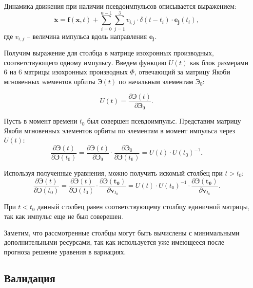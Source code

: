 Динамика движения при наличии псевдоимпульсов описывается выражением:
\begin{equation*}
    \ddot{\mathbf{x}} = \mathbf{f}(\mathbf{x}, t) +
        \sum_{i=0}^{n-1} \sum_{j=1}^{3} v_{i,j} 
                    \cdot \delta (t - t_i) \cdot \mathbf{e_j} (t_i),
\end{equation*}
где $v_{i,j}$ -- величина импульса вдоль направления $\mathbf{e_j}$.

Получим выражение для столбца в матрице изохронных производных, соответствующего одному импульсу.
Введем функцию $U(t)$ как блок размерами 6 на 6 матрицы изохронных производных $\Phi$, отвечающий за
матрицу Якоби мгновенных элементов орбиты $\mathbf{\textbf{Э}}(t)$ по начальным элементам 
$\mathbf{\textbf{Э}}_0$:

\begin{equation*}
    U(t) = \frac{\partial \mathbf{\textbf{Э}}(t)}{\partial \mathbf{\textbf{Э}}_0}.
\end{equation*}

Пусть в момент времени $t_0$ был совершен псевдоимпульс.
Представим матрицу Якоби мгновенных элементов орбиты по элементам в момент импульса через $U(t)$:
\begin{equation*}
    \frac{\partial \mathbf{\textbf{Э}}(t)}{\partial \mathbf{\textbf{Э}}(t_0)} = 
    \frac{\partial \mathbf{\textbf{Э}}(t)}{\partial \mathbf{\textbf{Э}}_0} \cdot
    \frac{\partial \mathbf{\textbf{Э}}_0}{\partial \mathbf{\textbf{Э}}(t_0)} = 
    U(t) \cdot U(t_0)^{-1}.
\end{equation*}

Используя полученные уравнения, можно получить искомый столбец при $t > t_0$:
\begin{equation*}
    \frac{\partial \mathbf{\textbf{Э}}(t)}{\partial \mathbf{\textbf{Э}}(t_0)} = 
    \frac{\partial \mathbf{\textbf{Э}}(t)}{\partial \mathbf{\textbf{Э}}(t_0)} \cdot
    \frac{\partial \mathbf{\textbf{Э}(t_0)}}{\partial \mathbf{v}_{t_0}} =
    U(t) \cdot U(t_0)^{-1} \cdot
    \frac{\partial \mathbf{\textbf{Э}(t_0)}}{\partial \mathbf{v}_{t_0}}.
\end{equation*}

При $t < t_0$ данный столбец равен соответствующему столбцу единичной матрицы, 
так как импульс еще не был соверешен.

Заметим, что рассмотренные столбцы могут быть вычислены с минимальными дополнительными
ресурсами, так как используется уже имеющееся после прогноза решение уравения в вариациях.

\subsection{Валидация}

